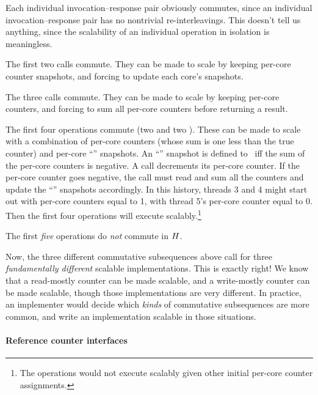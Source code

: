 \begin{CompactItemize}
\item Each individual invocation--response pair obviously commutes, since an
  individual invocation--response pair has no nontrivial re-interleavings.
  This doesn't tell us anything, since the scalability of an
  individual operation in isolation is meaningless.
\item The first two  calls commute. They can be made to scale
  by keeping per-core counter snapshots, and forcing  to update
  each core's snapshots.
\item The three  calls commute. They can be made to scale by
  keeping per-core counters, and forcing  to sum all per-core
  counters before returning a result.
\item The first four operations commute (two  and two ). These can be
  made to scale with a combination of per-core counters (whose sum is one
  less than the true counter) and
  per-core ``'' snapshots. An ``'' snapshot is defined to
  \TRUE\ iff the sum of the per-core counters is negative. A 
  call decrements its per-core counter. If the per-core counter goes
  negative, the  call must read and sum all the counters and update
  the ``'' snapshots accordingly.
  In this history, threads 3 and 4 might start out with per-core
  counters equal to 1, with thread 5's per-core counter equal to 0.
  Then the first four operations will execute scalably.\footnote{%
  The operations would not execute scalably given other
  initial per-core counter assignments.}
\end{CompactItemize}

The first \emph{five} operations do \emph{not} commute in $H$.

Now, the three different commutative subsequences above call for three
\emph{fundamentally different} scalable implementations. This is exactly
right! We know that a read-mostly counter can be made scalable, and a
write-mostly counter can be made scalable, though those implementations
are very different. In practice, an implementer would decide which
\emph{kinds} of commutative subsequences are more common, and write an
implementation scalable in those situations.


\paragraph{Reference counter interfaces}

